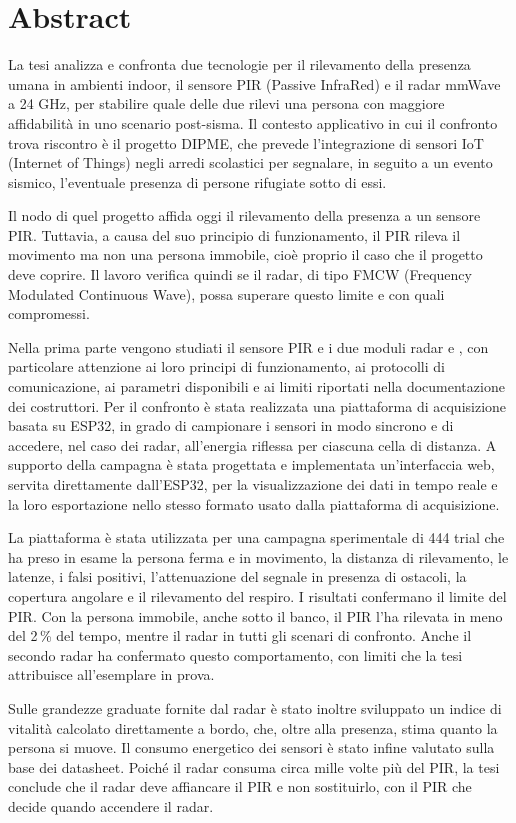 \chapter*{Abstract}
\label{chap:Abstract}

La tesi analizza e confronta due tecnologie per il rilevamento della presenza umana in ambienti indoor, il sensore PIR (Passive InfraRed) e il radar mmWave a 24 GHz, per stabilire quale delle due rilevi una persona con maggiore affidabilità in uno scenario post-sisma. Il contesto applicativo in cui il confronto trova riscontro è il progetto DIPME, che prevede l’integrazione di sensori IoT (Internet of Things) negli arredi scolastici per segnalare, in seguito a un evento sismico, l’eventuale presenza di persone rifugiate sotto di essi.

Il nodo di quel progetto affida oggi il rilevamento della presenza a un sensore PIR. Tuttavia, a causa del suo principio di funzionamento, il PIR rileva il movimento ma non una persona immobile, cioè proprio il caso che il progetto deve coprire. Il lavoro verifica quindi se il radar, di tipo FMCW (Frequency Modulated Continuous Wave), possa superare questo limite e con quali compromessi.

Nella prima parte vengono studiati il sensore PIR \pir{} e i due moduli radar \ldb{} e \ldc{}, con particolare attenzione ai loro principi di funzionamento, ai protocolli di comunicazione, ai parametri disponibili e ai limiti riportati nella documentazione dei costruttori. Per il confronto è stata realizzata una piattaforma di acquisizione basata su ESP32, in grado di campionare i sensori in modo sincrono e di accedere, nel caso dei radar, all’energia riflessa per ciascuna cella di distanza. A supporto della campagna è stata progettata e implementata un’interfaccia web, servita direttamente dall’ESP32, per la visualizzazione dei dati in tempo reale e la loro esportazione nello stesso formato usato dalla piattaforma di acquisizione.

La piattaforma è stata utilizzata per una campagna sperimentale di 444 trial che ha preso in esame la persona ferma e in movimento, la distanza di rilevamento, le latenze, i falsi positivi, l’attenuazione del segnale in presenza di ostacoli, la copertura angolare e il rilevamento del respiro. I risultati confermano il limite del PIR. Con la persona immobile, anche sotto il banco, il PIR l’ha rilevata in meno del 2\,\% del tempo, mentre il radar in tutti gli scenari di confronto. Anche il secondo radar ha confermato questo comportamento, con limiti che la tesi attribuisce all’esemplare in prova.

Sulle grandezze graduate fornite dal radar è stato inoltre sviluppato un indice di vitalità calcolato direttamente a bordo, che, oltre alla presenza, stima quanto la persona si muove. Il consumo energetico dei sensori è stato infine valutato sulla base dei datasheet. Poiché il radar consuma circa mille volte più del PIR, la tesi conclude che il radar deve affiancare il PIR e non sostituirlo, con il PIR che decide quando accendere il radar.
